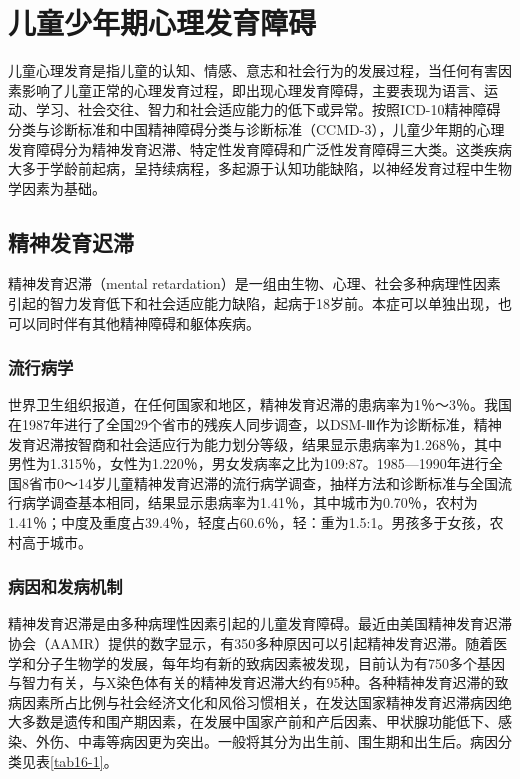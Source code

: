 \chapter{儿童少年期心理发育障碍}

儿童心理发育是指儿童的认知、情感、意志和社会行为的发展过程，当任何有害因素影响了儿童正常的心理发育过程，即出现心理发育障碍，主要表现为语言、运动、学习、社会交往、智力和社会适应能力的低下或异常。按照ICD-10精神障碍分类与诊断标准和中国精神障碍分类与诊断标准（CCMD-3），儿童少年期的心理发育障碍分为精神发育迟滞、特定性发育障碍和广泛性发育障碍三大类。这类疾病大多于学龄前起病，呈持续病程，多起源于认知功能缺陷，以神经发育过程中生物学因素为基础。

\section{精神发育迟滞}

精神发育迟滞（mental
retardation）是一组由生物、心理、社会多种病理性因素引起的智力发育低下和社会适应能力缺陷，起病于18岁前。本症可以单独出现，也可以同时伴有其他精神障碍和躯体疾病。

\subsection{流行病学}

世界卫生组织报道，在任何国家和地区，精神发育迟滞的患病率为1％～3％。我国在1987年进行了全国29个省市的残疾人同步调查，以DSM-Ⅲ作为诊断标准，精神发育迟滞按智商和社会适应行为能力划分等级，结果显示患病率为1.268％，其中男性为1.315％，女性为1.220％，男女发病率之比为109:87。1985---1990年进行全国8省市0～14岁儿童精神发育迟滞的流行病学调查，抽样方法和诊断标准与全国流行病学调查基本相同，结果显示患病率为1.41％，其中城市为0.70％，农村为1.41％；中度及重度占39.4％，轻度占60.6％，轻：重为1.5:1。男孩多于女孩，农村高于城市。

\subsection{病因和发病机制}

精神发育迟滞是由多种病理性因素引起的儿童发育障碍。最近由美国精神发育迟滞协会（AAMR）提供的数字显示，有350多种原因可以引起精神发育迟滞。随着医学和分子生物学的发展，每年均有新的致病因素被发现，目前认为有750多个基因与智力有关，与X染色体有关的精神发育迟滞大约有95种。各种精神发育迟滞的致病因素所占比例与社会经济文化和风俗习惯相关，在发达国家精神发育迟滞病因绝大多数是遗传和围产期因素，在发展中国家产前和产后因素、甲状腺功能低下、感染、外伤、中毒等病因更为突出。一般将其分为出生前、围生期和出生后。病因分类见表\ref{tab16-1}。

